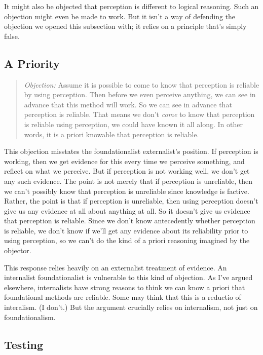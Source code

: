 It might also be objected that perception is different to logical reasoning. Such an objection might even be made to work. But it isn't a way of defending the objection we opened this subsection with; it relies on a principle that's simply false.

\subsection{A Priority}

\begin{quote}\textit{Objection:}
Assume it is possible to come to know that perception is reliable by using perception. Then before we even perceive anything, we can see in advance that this method will work. So we can see in advance that perception is reliable. That means we don't \textit{come} to know that perception is reliable using perception, we could have known it all along. In other words, it is a priori knowable that perception is reliable.
\end{quote}

\noindent This objection misstates the foundationalist externalist's position. If perception is working, then we get evidence for this every time we perceive something, and reflect on what we perceive. But if perception is not working well, we don't get any such evidence. The point is not merely that if perception is unreliable, then we can't possibly know that perception is unreliable since knowledge is factive. Rather, the point is that if perception is unreliable, then using perception doesn't give us any evidence at all about anything at all. So it doesn't give us evidence that perception is reliable. Since we don't know antecedently whether perception is reliable, we don't know if we'll get any evidence about its reliability prior to using perception, so we can't do the kind of a priori reasoning imagined by the objector.

This response relies heavily on an externalist treatment of evidence. An internalist foundationalist is vulnerable to this kind of objection. As I've argued elsewhere, internalists have strong reasons to think we can know a priori that foundational methods are reliable. Some may think that this is a reductio of interalism. (I don't.) But the argument crucially relies on internalism, not just on foundationalism.

\subsection{Testing}

